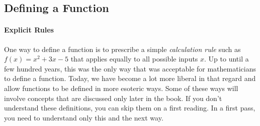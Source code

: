 

\subsection{Defining a Function}

\paragraph{Explicit Rules}
One way to define a function is to prescribe a simple \emph{calculation rule} such as $f(x) = x^2 + 3 x - 5$ that applies equally to all possible inputs $x$. Up to until a few hundred years, this was the only way that was acceptable for mathematicians to define a function. Today, we have become a lot more liberal in that regard and allow functions to be defined in more esoteric ways. Some of these ways will involve concepts that are discussed only later in the book. If you don't understand these definitions, you can skip them on a first reading. In a first pass, you need to understand only this and the next way.

